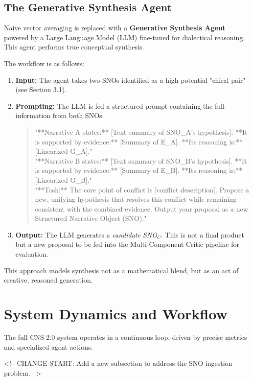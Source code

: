 \documentclass[12pt, a4paper]{article}
\begin{document}
\subsection{The Generative Synthesis Agent}
Naive vector averaging is replaced with a \textbf{Generative Synthesis Agent} powered by a Large Language Model (LLM) fine-tuned for dialectical reasoning. This agent performs true conceptual synthesis.

The workflow is as follows:
\begin{enumerate}
    \item \textbf{Input:} The agent takes two SNOs identified as a high-potential "chiral pair" (see Section 3.1).
    \item \textbf{Prompting:} The LLM is fed a structured prompt containing the full information from both SNOs:
        \begin{quote}
        "**Narrative A states:** [Text summary of SNO\_A's hypothesis]. **It is supported by evidence:** [Summary of E\_A]. **Its reasoning is:** [Linearized G\_A]." \\
        "**Narrative B states:** [Text summary of SNO\_B's hypothesis]. **It is supported by evidence:** [Summary of E\_B]. **Its reasoning is:** [Linearized G\_B]." \\
        "**Task:** The core point of conflict is [conflict description]. Propose a new, unifying hypothesis that resolves this conflict while remaining consistent with the combined evidence. Output your proposal as a new Structured Narrative Object (SNO)."
        \end{quote}
    \item \textbf{Output:} The LLM generates a \textit{candidate SNO$_C$}. This is not a final product but a new proposal to be fed into the Multi-Component Critic pipeline for evaluation.
\end{enumerate}
This approach models synthesis not as a mathematical blend, but as an act of creative, reasoned generation.

\section{System Dynamics and Workflow}
The full CNS 2.0 system operates in a continuous loop, driven by precise metrics and specialized agent actions.

<!-- CHANGE START: Add a new subsection to address the SNO ingestion problem. -->
\end{document}
